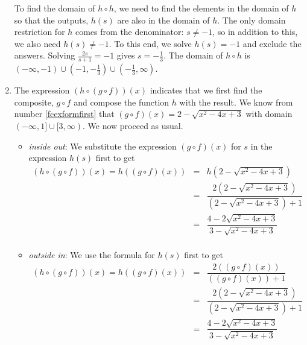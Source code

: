 \begin{ex}
\begin{enumerate}
To find the domain of $h \circ h$,  we need to find the elements in the domain of $h$ so that the outputs, $h(s)$ are also in the domain of $h$.  The only domain restriction for $h$ comes from the denominator: $s \neq -1$, so in addition to this, we also need $h(s) \neq -1$.  To this end, we solve $h(s) = -1$ and exclude the answers.  Solving   $\frac{2s}{s+1} = -1$ gives $s = -\frac{1}{3}$.  The domain of $h \circ h$ is $(-\infty, -1) \cup \left(-1, -\frac{1}{3}\right) \cup \left(-\frac{1}{3}, \infty\right)$. 

\item  The expression $(h \circ (g \circ f))(x)$ indicates that we first find the composite, $g \circ f$ and compose the function $h$ with the result.  We know from number \ref{fcexformfirst} that $(g \circ f)(x) =  2 - \sqrt{x^2-4x+3}$ with domain $(-\infty, 1] \cup [3,\infty)$.  We now proceed as usual.

\begin{itemize}

\item  \textit{inside out}: We substitute the expression $(g \circ f)(x)$ for $s$ in the expression $h(s)$ first to get\\
\[\begin{array}{rclr} (h \circ (g \circ f))(x)  =  h((g \circ f)(x))&=&h\left(2 - \sqrt{x^2-4x+3}\right)  & \\ [5pt]
 & = & \dfrac{2 \left(2 - \sqrt{x^2-4x+3}\right)}{\left(2 - \sqrt{x^2-4x+3}\right)+1} & \\ [20pt]
 & = & \dfrac{4 - 2\sqrt{x^2-4x+3}}{3 - \sqrt{x^2-4x+3}} & \\
 \end{array}
\]

\item  \textit{outside in}:  We use the formula for $h(s)$ first to get\\
\[
\begin{array}{rclr} (h \circ (g \circ f))(x)  =  h((g \circ f)(x))&=&\dfrac{2 \left( (g \circ f)(x)\right)}{  \left( (g \circ f)(x)\right) + 1}  & \\[15pt]
& = & \dfrac{2 \left(2 - \sqrt{x^2-4x+3}\right)}{\left(2 - \sqrt{x^2-4x+3}\right)+1} & \\[20pt]
 & = & \dfrac{4 - 2\sqrt{x^2-4x+3}}{3 - \sqrt{x^2-4x+3}} &\\
 \end{array}
 \]
 \end{itemize}
 

\end{enumerate}
\end{ex}

